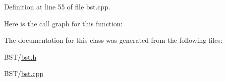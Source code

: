 Definition at line 55 of file bst.\+cpp.



Here is the call graph for this function\+:




The documentation for this class was generated from the following files\+:\begin{DoxyCompactItemize}
\item 
B\+S\+T/\hyperlink{bst_8h}{bst.\+h}\item 
B\+S\+T/\hyperlink{bst_8cpp}{bst.\+cpp}\end{DoxyCompactItemize}
